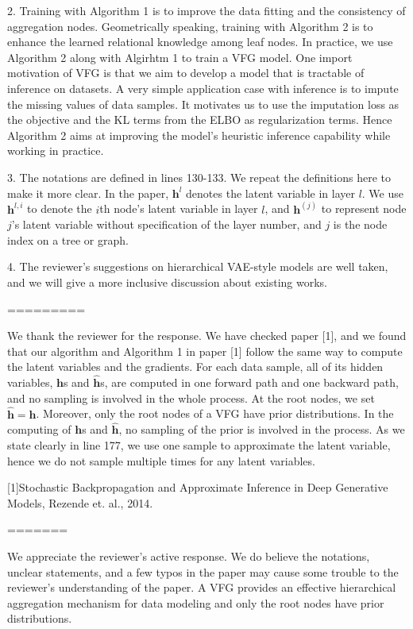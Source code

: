 \documentclass{article}
\begin{document}
2.   Training with Algorithm 1 is to improve the data fitting and the consistency of aggregation nodes. Geometrically speaking, training with Algorithm 2 is to enhance the learned relational knowledge among leaf nodes. In practice, we use  Algorithm 2  along with Algirhtm 1 to train a VFG model. 
One import motivation of VFG is that we aim to develop a model that is tractable of inference on datasets. 
A very simple application case with inference is to impute the missing values of data samples.  
It motivates us to use the imputation loss as the objective and the KL terms from the ELBO as regularization terms. 
Hence Algorithm 2 aims at improving the model's heuristic inference capability while working in practice.

3. The notations are defined in lines 130-133. We repeat the definitions here to make it more clear.   In the paper, $\mathbf{h}^l$ denotes the latent variable in layer $l$.   We use $\mathbf{h}^{l, i}$ to denote the $i$th node's latent variable  in layer $l$, and $\mathbf{h}^{(j)}$ to represent node $j$'s latent variable without specification of the layer number, and $j$ is the node index on a tree or graph.  

4. The reviewer's suggestions on hierarchical VAE-style models are well taken, and we will give a more inclusive discussion about existing works. 


=========

We thank the reviewer for the response.  We have checked paper [1], and we found that  our algorithm and Algorithm 1 in paper [1] follow the same way to compute the latent variables and the gradients. For each  data sample, all of its hidden variables,  $\mathbf{h}$s and $\widehat{\mathbf{h}}$s,  are computed in one forward path and one backward path, and no sampling is involved in the whole process. At the root nodes, we set  $\widehat{\mathbf{h}} = \mathbf{h}$. Moreover, only the root nodes of a VFG have prior distributions.  In the computing of $\mathbf{h}$s and $\widehat{\mathbf{h}}$, no sampling of the prior is involved in the process. As we state clearly in line 177, we use one sample to approximate the latent variable, hence we do not sample multiple times for any latent variables.   


[1]Stochastic Backpropagation and Approximate Inference in Deep Generative Models, Rezende et. al., 2014.


=======

We appreciate the reviewer’s active response.  We do believe the notations, unclear statements, and a few typos in the paper may cause some trouble to the reviewer's understanding of the paper. A VFG provides an effective hierarchical aggregation mechanism for data modeling and only the root nodes have prior distributions.  
\end{document}
